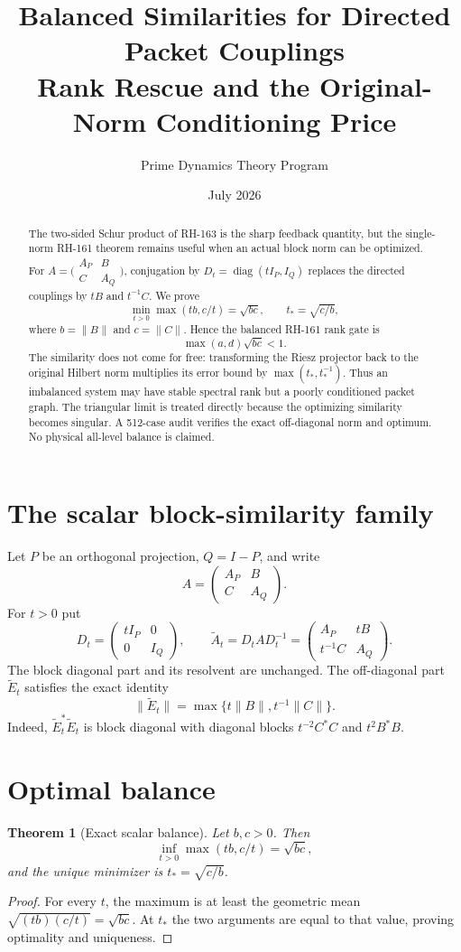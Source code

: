 \documentclass[12pt]{article}
\title{Balanced Similarities for Directed Packet Couplings\\\large Rank Rescue and the Original-Norm Conditioning Price}
\author{Prime Dynamics Theory Program}
\date{July 2026}
\newtheorem{theorem}{Theorem}
\newcommand{\norm}[1]{\lVert#1\rVert}
\begin{document}
\maketitle
\begin{abstract}
The two-sided Schur product of RH-163 is the sharp feedback quantity, but the
single-norm RH-161 theorem remains useful when an actual block norm can be
optimized.  For
$A=\bigl(\begin{smallmatrix}A_P&B\\C&A_Q\end{smallmatrix}\bigr)$,
conjugation by $D_t=\operatorname{diag}(tI_P,I_Q)$ replaces the directed
couplings by $tB$ and $t^{-1}C$.  We prove
\[
 \min_{t>0}\max(tb,c/t)=\sqrt{bc},\qquad t_*=\sqrt{c/b},
\]
where $b=\norm B$ and $c=\norm C$.  Hence the balanced RH-161 rank gate is
\[
 \max(a,d)\sqrt{bc}<1.
\]
The similarity does not come for free: transforming the Riesz projector back
to the original Hilbert norm multiplies its error bound by
$\max(t_*,t_*^{-1})$.  Thus an imbalanced system may have stable spectral
rank but a poorly conditioned packet graph.  The triangular limit is treated
directly because the optimizing similarity becomes singular.  A 512-case
audit verifies the exact off-diagonal norm and optimum.  No physical
all-level balance is claimed.
\end{abstract}

\section{The scalar block-similarity family}
Let $P$ be an orthogonal projection, $Q=I-P$, and write
\[
 A=\begin{pmatrix}A_P&B\\C&A_Q\end{pmatrix}.
\]
For $t>0$ put
\[
 D_t=\begin{pmatrix}tI_P&0\\0&I_Q\end{pmatrix},\qquad
 \widetilde A_t=D_tAD_t^{-1}
 =\begin{pmatrix}A_P&tB\\t^{-1}C&A_Q\end{pmatrix}.
\]
The block diagonal part and its resolvent are unchanged.  The off-diagonal
part $\widetilde E_t$ satisfies the exact identity
\[
 \norm{\widetilde E_t}
 =\max\{t\norm B,t^{-1}\norm C\}.
\]
Indeed, $\widetilde E_t^*\widetilde E_t$ is block diagonal with diagonal
blocks $t^{-2}C^*C$ and $t^2B^*B$.

\section{Optimal balance}
\begin{theorem}[Exact scalar balance]\label{thm:balance}
Let $b,c>0$.  Then
\[
 \inf_{t>0}\max(tb,c/t)=\sqrt{bc},
\]
and the unique minimizer is $t_*=\sqrt{c/b}$.
\end{theorem}
\begin{proof}
For every $t$, the maximum is at least the geometric mean
$\sqrt{(tb)(c/t)}=\sqrt{bc}$.  At $t_*$ the two arguments are equal to that
value, proving optimality and uniqueness.
\end{proof}
\end{document}
